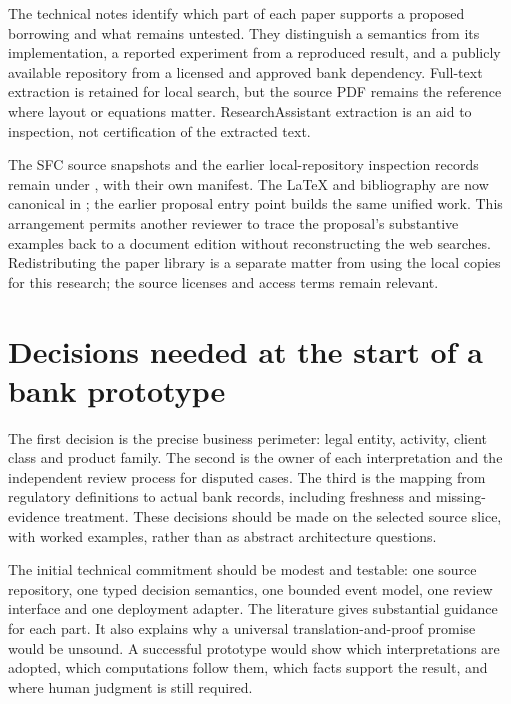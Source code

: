 \documentclass[12pt,a4paper,oneside,openany]{book}
\begin{document}
The technical notes identify which part of each paper supports a proposed
borrowing and what remains untested. They distinguish a semantics from its
implementation, a reported experiment from a reproduced result, and a publicly
available repository from a licensed and approved bank dependency. Full-text
extraction is retained for local search, but the source PDF remains the reference
where layout or equations matter. ResearchAssistant extraction is an aid to
inspection, not certification of the extracted text.

The SFC source snapshots and the earlier local-repository inspection records
remain under , with their own manifest. The LaTeX and
bibliography are now canonical in ; the earlier
proposal entry point builds the same unified work. This arrangement permits another
reviewer to trace the proposal's substantive examples back to a document edition
without reconstructing the web searches. Redistributing the paper library is a
separate matter from using the local copies for this research; the source licenses
and access terms remain relevant.

\section{Decisions needed at the start of a bank prototype}
\label{merge:P-05-evidence:03}


The first decision is the precise business perimeter: legal entity, activity,
client class and product family. The second is the owner of each interpretation
and the independent review process for disputed cases. The third is the mapping
from regulatory definitions to actual bank records, including freshness and
missing-evidence treatment. These decisions should be made on the selected source
slice, with worked examples, rather than as abstract architecture questions.

The initial technical commitment should be modest and testable: one source
repository, one typed decision semantics, one bounded event model, one review
interface and one deployment adapter. The literature gives substantial guidance
for each part. It also explains why a universal translation-and-proof promise
would be unsound. A successful prototype would show which interpretations are
adopted, which computations follow them, which facts support the result, and where
human judgment is still required.
\end{document}
